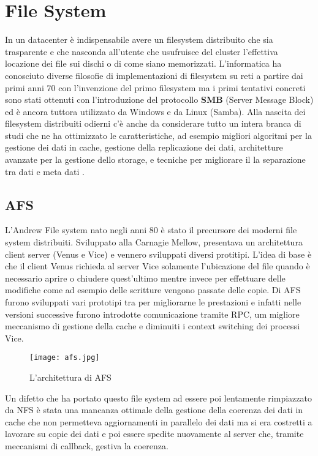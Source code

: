 \section{File System} 
In un datacenter è indispensabile avere un filesystem distribuito che sia trasparente e che nasconda all'utente che usufruisce del cluster l'effettiva locazione dei file sui dischi o di come siano memorizzati. L'informatica ha conosciuto diverse filosofie di implementazioni di filesystem su reti a partire dai primi anni 70 con l'invenzione del primo filesystem ma i primi tentativi concreti sono stati ottenuti con l'introduzione del protocollo \textbf{SMB} (Server Message Block) ed è ancora tuttora utilizzato da Windows e da Linux (Samba). Alla nascita dei filesystem distribuiti odierni c'è anche da considerare tutto un intera branca di studi che ne ha ottimizzato le caratteristiche, ad esempio migliori algoritmi per la gestione dei dati in cache\cite{dahlin94}, gestione della replicazione dei dati\cite{petersen97}, architetture avanzate per la gestione dello storage\cite{gibson98}, e tecniche per migliorare il la separazione tra dati e meta dati \cite{thekkat94}.
\subsection{AFS}
L'Andrew File system nato negli anni 80 è stato il precursore dei moderni file system distribuiti. Sviluppato alla Carnagie Mellow, presentava un architettura client server (Venus e Vice) e vennero sviluppati diversi protitipi. L'idea di base è che il client Venus richieda al server Vice solamente l'ubicazione del file quando è necessario aprire o chiudere quest'ultimo mentre invece per effettuare delle modifiche come ad esempio delle scritture vengono passate delle copie. Di AFS furono sviluppati vari prototipi tra per migliorarne le prestazioni e infatti nelle versioni successive furono introdotte comunicazione tramite RPC, um migliore meccanismo di gestione della cache e diminuiti i context switching dei processi Vice.\cite{howard88} \\
\begin{figure}[ht]
  \begin{center}
    \texttt{[image: afs.jpg]}
    \caption{L'architettura di AFS}
    \label{afs}
  \end{center}
\end{figure}
Un difetto che ha portato questo file system ad essere poi lentamente rimpiazzato da NFS è stata una mancanza ottimale della gestione della coerenza dei dati in cache che non permetteva aggiornamenti in parallelo dei dati ma si era costretti a lavorare su copie dei dati e poi essere spedite nuovamente al server che, tramite meccanismi di callback, gestiva la coerenza.
